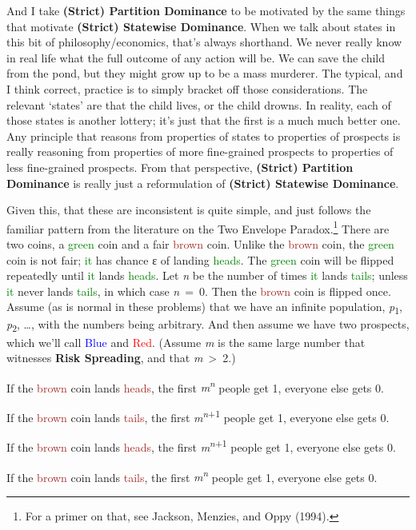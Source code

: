 \documentclass[
  letterpaper,
  DIV=11,
  numbers=noendperiod]{scrartcl}
\providecommand{\tightlist}{%
  \setlength{\itemsep}{0pt}\setlength{\parskip}{0pt}}
\begin{document}
And I take \textbf{(Strict) Partition Dominance} to be motivated by the
same things that motivate \textbf{(Strict) Statewise Dominance}. When we
talk about states in this bit of philosophy/economics, that's always
shorthand. We never really know in real life what the full outcome of
any action will be. We can save the child from the pond, but they might
grow up to be a mass murderer. The typical, and I think correct,
practice is to simply bracket off those considerations. The relevant
`states' are that the child lives, or the child drowns. In reality, each
of those states is another lottery; it's just that the first is a much
much better one. Any principle that reasons from properties of states to
properties of prospects is really reasoning from properties of more
fine-grained prospects to properties of less fine-grained prospects.
From that perspective, \textbf{(Strict) Partition Dominance} is really
just a reformulation of \textbf{(Strict) Statewise Dominance}.

Given this, that these are inconsistent is quite simple, and just
follows the familiar pattern from the literature on the Two Envelope
Paradox.\footnote{For a primer on that, see Jackson, Menzies, and Oppy
  (1994).} There are two coins, a \textcolor{green}{green} coin and a
fair \textcolor{brown}{brown} coin. Unlike the \textcolor{brown}{brown}
coin, the \textcolor{green}{green} coin is not fair;
\textcolor{green}{it} has chance ε of landing \textcolor{green}{heads}.
The \textcolor{green}{green} coin will be flipped repeatedly until
\textcolor{green}{it} lands \textcolor{green}{heads}. Let \emph{n} be
the number of times \textcolor{green}{it} lands
\textcolor{green}{tails}; unless \textcolor{green}{it} never lands
\textcolor{green}{tails}, in which case \emph{n}~=~0. Then the
\textcolor{brown}{brown} coin is flipped once. Assume (as is normal in
these problems) that we have an infinite population,
\emph{p}\textsubscript{1}, \emph{p}\textsubscript{2}, \ldots, with the
numbers being arbitrary. And then assume we have two prospects, which
we'll call \textcolor{blue}{Blue} and \textcolor{red}{Red}. (Assume
\emph{m} is the same large number that witnesses \textbf{Risk
Spreading}, and that \emph{m}~\textgreater~2.)

\begin{description}
\tightlist
\item[\textcolor{blue}{Blue}]
If the \textcolor{brown}{brown} coin lands \textcolor{brown}{heads}, the
first \emph{m\textsuperscript{n}} people get 1, everyone else gets 0.

If the \textcolor{brown}{brown} coin lands \textcolor{brown}{tails}, the
first \emph{m}\textsuperscript{\emph{n}+1} people get 1, everyone else
gets 0.
\item[\textcolor{red}{Red}]
If the \textcolor{brown}{brown} coin lands \textcolor{brown}{heads}, the
first \emph{m}\textsuperscript{\emph{n}+1} people get 1, everyone else
gets 0.

If the \textcolor{brown}{brown} coin lands \textcolor{brown}{tails}, the
first \emph{m\textsuperscript{n}} people get 1, everyone else gets 0.
\end{description}
\end{document}

